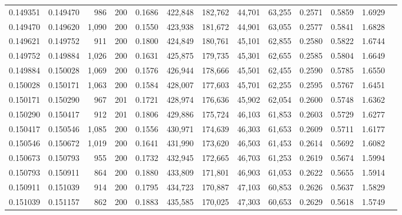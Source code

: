 \begin{tabular}{rrrrrrrrrrrrr}
0.149351 & 0.149470 &    986 & 200 &                                     0.1686 & 422,848 & 182,762 &  44,701 &  63,255 & 0.2571 & 0.5859 & 1.6929 \\
0.149470 & 0.149620 &  1,090 & 200 &                                     0.1550 & 423,938 & 181,672 &  44,901 &  63,055 & 0.2577 & 0.5841 & 1.6828 \\
0.149621 & 0.149752 &    911 & 200 &                                     0.1800 & 424,849 & 180,761 &  45,101 &  62,855 & 0.2580 & 0.5822 & 1.6744 \\
0.149752 & 0.149884 &  1,026 & 200 &                                     0.1631 & 425,875 & 179,735 &  45,301 &  62,655 & 0.2585 & 0.5804 & 1.6649 \\
0.149884 & 0.150028 &  1,069 & 200 &                                     0.1576 & 426,944 & 178,666 &  45,501 &  62,455 & 0.2590 & 0.5785 & 1.6550 \\
0.150028 & 0.150171 &  1,063 & 200 &                                     0.1584 & 428,007 & 177,603 &  45,701 &  62,255 & 0.2595 & 0.5767 & 1.6451 \\
0.150171 & 0.150290 &    967 & 201 &                                     0.1721 & 428,974 & 176,636 &  45,902 &  62,054 & 0.2600 & 0.5748 & 1.6362 \\
0.150290 & 0.150417 &    912 & 201 &                                     0.1806 & 429,886 & 175,724 &  46,103 &  61,853 & 0.2603 & 0.5729 & 1.6277 \\
0.150417 & 0.150546 &  1,085 & 200 &                                     0.1556 & 430,971 & 174,639 &  46,303 &  61,653 & 0.2609 & 0.5711 & 1.6177 \\
0.150546 & 0.150672 &  1,019 & 200 &                                     0.1641 & 431,990 & 173,620 &  46,503 &  61,453 & 0.2614 & 0.5692 & 1.6082 \\
0.150673 & 0.150793 &    955 & 200 &                                     0.1732 & 432,945 & 172,665 &  46,703 &  61,253 & 0.2619 & 0.5674 & 1.5994 \\
0.150793 & 0.150911 &    864 & 200 &                                     0.1880 & 433,809 & 171,801 &  46,903 &  61,053 & 0.2622 & 0.5655 & 1.5914 \\
0.150911 & 0.151039 &    914 & 200 &                                     0.1795 & 434,723 & 170,887 &  47,103 &  60,853 & 0.2626 & 0.5637 & 1.5829 \\
0.151039 & 0.151157 &    862 & 200 &                                     0.1883 & 435,585 & 170,025 &  47,303 &  60,653 & 0.2629 & 0.5618 & 1.5749 \\

\end{tabular}
